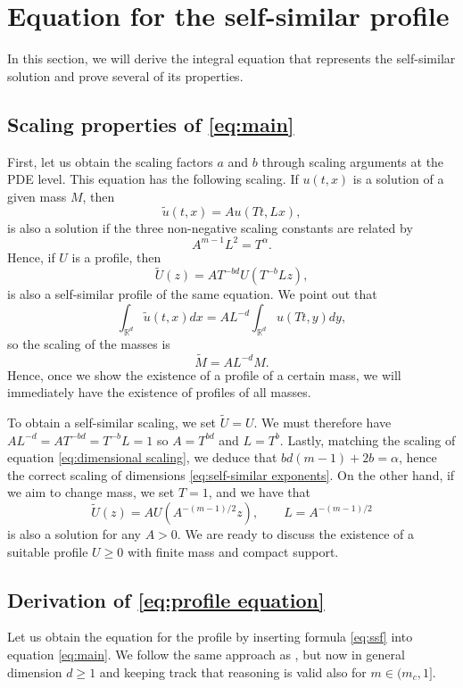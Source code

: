 \documentclass[a4paper]{article}
\theoremstyle{definition}
\newcommand{\Rd}{{\mathbb{R}^d}}
\begin{document}
%
\section{Equation for the self-similar profile}
In this section, we will derive the integral equation that represents the self-similar solution and prove several of its properties.

%

\subsection{Scaling properties of \eqref{eq:main}}
\label{sec:scaling}
First, let us obtain the scaling factors $a$ and $b$ through scaling arguments at the PDE level.
This equation has the following scaling. If $u(t,x)$ is a solution of a given mass $M$, then
\begin{equation*}
  \widetilde u(t,x) = A u(Tt, Lx ),
\end{equation*}
is also a solution if the three non-negative scaling constants are related by
\begin{equation}
  \label{eq:dimensional scaling}
  A^{m-1} L^2 = T^\alpha.
\end{equation}
Hence, if $U$ is a profile, then
\[
  \widetilde U (z) = A T^{-bd} U(T^{-b} L z),
\]
is also a self-similar profile of the same equation. We point out that
\[
  \int_\Rd \widetilde u(t,x) dx = A L^{-d} \int_\Rd u(Tt, y) dy,
\]
so the scaling of the masses is
\[
  \widetilde M = A L^{-d} M.
\]
Hence, once we show the existence of a profile of a certain mass, we will immediately have the existence of profiles of all masses.

To obtain a self-similar scaling, we set $\widetilde U = U$. We must therefore have $A L^{-d} = AT^{-bd} = T^{-b}L = 1$ so $A = T^{bd}$ and $L = T^b$. Lastly, matching the scaling of equation \eqref{eq:dimensional scaling}, we deduce that $bd(m-1) + 2b = \alpha$, hence the correct scaling of dimensions \eqref{eq:self-similar exponents}. On the other hand, if we aim to change mass, we set $T = 1$, and we have that
\begin{equation}
  \label{eq:scaling solutions}
  \widetilde U (z) = A U(A^{-({m-1})/2} z), \qquad L = A^{-({m-1})/2}
\end{equation}
is also a solution for any $A > 0$.
We are ready to discuss the existence of a suitable profile $U\ge 0$ with finite mass and compact support.

\subsection{Derivation of \eqref{eq:profile equation}}
Let us obtain the equation for the profile by inserting formula \eqref{eq:ssf} into equation \eqref{eq:main}. 
We follow the same approach as \cite{CaballeroOkrasinska-PlociniczakPlociniczakSadarangani2025}, but now in general dimension $d \ge 1$ and keeping track that reasoning is valid also for $m \in (m_c,1]$.
\end{document}
